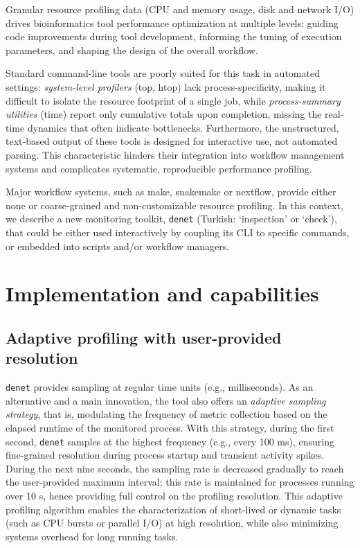 \documentclass[10pt]{article}
\begin{document}
Granular resource profiling data (CPU and memory usage, disk and network I/O) drives bioinformatics tool performance optimization at multiple levels: guiding code improvements during tool development, informing the tuning of execution parameters, and shaping the design of the overall workflow.

Standard command-line tools are poorly suited for this task in automated settings: \emph{system-level profilers} (top, htop) lack process-specificity, making it difficult to isolate the resource footprint of a single job, while \emph{process-summary utilities} (time) report only cumulative totals upon completion, missing the real-time dynamics that often indicate bottlenecks. Furthermore, the unstructured, text-based output of these tools is designed for interactive use, not automated parsing. This characteristic hinders their integration into workflow management systems and complicates systematic, reproducible performance profiling.

Major workflow systems, such as make, snakemake or nextflow, provide either none or coarse-grained and non-customizable resource profiling. In this context, we describe a new monitoring toolkit, \texttt{denet} (Turkish: `inspection' or `check'), that could be either used interactively by coupling its CLI to specific commands, or embedded into scripts and/or workflow managers.

\section*{Implementation and capabilities}

\subsection*{Adaptive profiling with user-provided resolution}

\texttt{denet} provides sampling at regular time units (e.g., milliseconds). As an alternative and a main innovation, the tool also offers an \emph{adaptive sampling strategy}, that is, modulating the frequency of metric collection based on the elapsed runtime of the monitored process. With this strategy, during the first second, \texttt{denet} samples at the highest frequency (e.g., every 100 ms), ensuring fine-grained resolution during process startup and transient activity spikes. During the next nine seconds, the sampling rate is decreased gradually to reach the user-provided maximum interval; this rate is maintained for processes running over 10 s, hence providing full control on the profiling resolution.
This adaptive profiling algorithm enables the characterization of short-lived or dynamic tasks (such as CPU bursts or parallel I/O) at high resolution, while also minimizing systems overhead for long running tasks.
\end{document}
